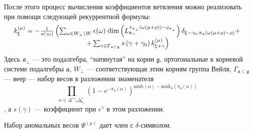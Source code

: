 После этого процесс вычисления коэффициентов ветвления можно реализовать при помощи следующей
рекуррентной формулы:
\begin{equation}
  \label{eq:1}
  \begin{array}{c}
      k_{\xi }^{\left( \mu \right) }=-\frac{1}{s\left( \gamma _{0}\right) }\left(
  \sum_{\omega\in W_{\bot}\backslash W} \epsilon(\omega)\; {\rm dim}\left(L^{\pi_{\mathfrak{a}_{\bot}}(\omega(\mu+\rho))-\rho_{\mathfrak{a}_{\bot}}}_{\mathfrak{a}_{\bot}}\right) \delta_{\xi-\gamma_0,\pi_{\mathfrak{a}}(\omega(\mu+\rho)-\rho)}+ \right.\\
\left.
+\sum_{\gamma \in
\Gamma _{\frak{a}\subset \frak{g}}}s\left( \gamma +\gamma _{0}\right) k_{\xi
+\gamma }^{\left( \mu \right) }\right)

  \end{array}
\end{equation}
Здесь $\mathfrak{a}_{\bot}$ --- это подалгебра, ``натянутая'' на корни $\mathfrak{g}$, ортогональные
к корневой системе подалгебры  $\mathfrak{a}$, $W_{\bot}$ --- соответствующая этим корням группа Вейля,
$\Gamma_{\mathfrak{a}\subset \mathfrak{g}}$ --- веер --- набор весов в разложении знаменателя $$\prod_{\alpha\in \Delta^{+}\setminus \Delta^{+}_{\mathfrak{a}_{\bot}}}
(1-e^{-\pi_{\mathfrak{a}}(\alpha)})^{\mathrm{mult}(\alpha)-\mathrm{mult}_{\mathfrak{a}}(\pi_{\mathfrak{a}}(\alpha))}$$, а $s(\gamma)$ ---
коэффициент при  $e^{\gamma}$ в этом разложении.

Набор аномальных весов $\Psi^{(\mu)}$ дает член с $\delta$-символом.

